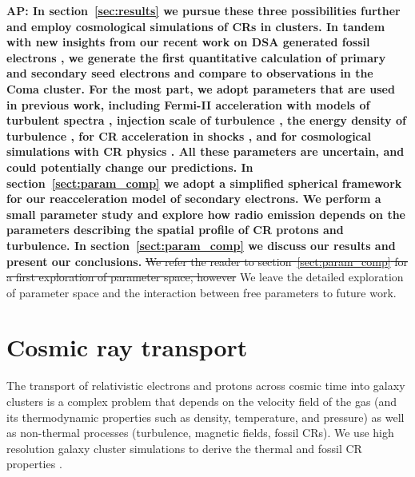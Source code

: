 \documentclass[fleqn,usenatbib,useAMS]{mnras}
\def\AP2#1{{\bf  AP2: #1}}
\def\AP#1{{\bf {\color{blue} AP: #1}}}
\begin{document}
\AP{In section~\ref{sec:results} we pursue these three possibilities
  further and employ cosmological simulations of CRs in clusters. In
  tandem with new insights from our recent work on DSA generated
  fossil electrons \citep{pinzke13}, we generate the first
  quantitative calculation of primary and secondary seed electrons and
  compare to observations in the Coma cluster. For the most part, we
  adopt parameters that are used in previous work, including Fermi-II
  acceleration with models of turbulent spectra
  \citep{brunetti07,brunetti11}, injection scale of turbulence
  \citep{miniati15}, the energy density of turbulence
  \citep{2009ApJ...705.1129L,2010ApJ...725.1452S,2011A&A...529A..17V},
  for CR acceleration in shocks \citep[][in particular $K_{\rmn{ep}}$
    and the acceleration efficiency]{pinzke13}, and for cosmological
  simulations with CR physics \citep[][i.e., shock history,
    temperature profile, density profile, magnetic field
    profile]{pinzke10}. All these parameters are uncertain, and could
  potentially change our predictions. In section~\ref{sect:param_comp}
  we adopt a simplified spherical framework for our reacceleration
  model of secondary electrons. We perform a small parameter study and
  explore how radio emission depends on the parameters describing the
  spatial profile of CR protons and turbulence. In
  section~\ref{sect:param_comp} we discuss our results and present our
  conclusions.} \sout{We refer the reader to
  section~\ref{sect:param_comp} for a first exploration of parameter
  space, however} We leave the detailed exploration of parameter space
and the interaction between free parameters to future work.


\section{Cosmic ray transport}

The transport of relativistic electrons and protons across cosmic time
into galaxy clusters is a complex problem that depends on the velocity
field of the gas (and its thermodynamic properties such as density,
temperature, and pressure) as well as non-thermal processes
(turbulence, magnetic fields, fossil CRs). We use high resolution
galaxy cluster simulations to derive the thermal and fossil CR
properties \citep[shock accelerated primary CRes and CRps, as well as
  secondary CRes produced in p-p collisions,
  see][]{2007MNRAS.378..385P,pfrommer08,pinzke10,pinzke13}.
\end{document}
